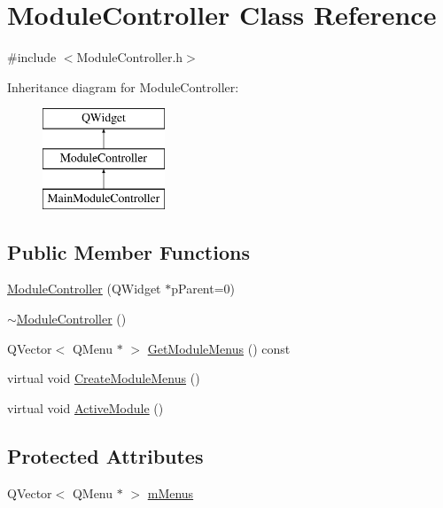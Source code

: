 \hypertarget{class_module_controller}{\section{Module\+Controller Class Reference}
\label{class_module_controller}
}


{\ttfamily \#include $<$Module\+Controller.\+h$>$}

Inheritance diagram for Module\+Controller\+:\begin{figure}[H]
\begin{center}
\leavevmode
\includegraphics[height=3.000000cm]{class_module_controller}
\end{center}
\end{figure}
\subsection*{Public Member Functions}
\begin{DoxyCompactItemize}
\item 
\hyperlink{class_module_controller_a550494dd0fd641706c3962db991aea1d}{Module\+Controller} (Q\+Widget $\ast$p\+Parent=0)
\item 
\hyperlink{class_module_controller_a3e7546d6afabff3e41440521966f0c0f}{$\sim$\+Module\+Controller} ()
\item 
Q\+Vector$<$ Q\+Menu $\ast$ $>$ \hyperlink{class_module_controller_a9c33aa7a7fbc8fac04fd246a46d02f2f}{Get\+Module\+Menus} () const 
\item 
virtual void \hyperlink{class_module_controller_a13dcc77a615e926689058eb7f74a3f1e}{Create\+Module\+Menus} ()
\item 
virtual void \hyperlink{class_module_controller_acc85cc2871de72806b7ce6db1bd5e09d}{Active\+Module} ()
\end{DoxyCompactItemize}
\subsection*{Protected Attributes}
\begin{DoxyCompactItemize}
\item 
Q\+Vector$<$ Q\+Menu $\ast$ $>$ \hyperlink{class_module_controller_a4931a6eb2fb04603bee99760b3a71ecb}{m\+Menus}
\end{DoxyCompactItemize}


